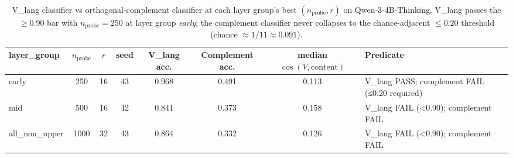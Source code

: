 \begin{table}[t]
\centering
\caption{V\_lang classifier vs orthogonal-complement classifier at each layer group's best $(n_{\text{probe}}, r)$ on Qwen-3-4B-Thinking. V\_lang passes the $\geq0.90$ bar with $n_{\text{probe}}=250$ at layer group \emph{early}; the complement classifier never collapses to the chance-adjacent $\leq 0.20$ threshold (chance $\approx 1/11 \approx 0.091$).}
\label{tab:c1_v_lang_vs_complement}
\begin{tabular}{lccccccl}
\toprule
layer\_group & $n_{\text{probe}}$ & $r$ & seed & V\_lang acc. & Complement acc. & median $\cos(V, \text{content})$ & Predicate \\
\midrule
early & 250 & 16 & 43 & 0.968 & 0.491 & 0.113 & V_lang PASS; complement FAIL (≤0.20 required) \\
mid & 500 & 16 & 42 & 0.841 & 0.373 & 0.158 & V_lang FAIL (<0.90); complement FAIL \\
all_non_upper & 1000 & 32 & 43 & 0.864 & 0.332 & 0.126 & V_lang FAIL (<0.90); complement FAIL \\
\bottomrule
\end{tabular}
\end{table}
